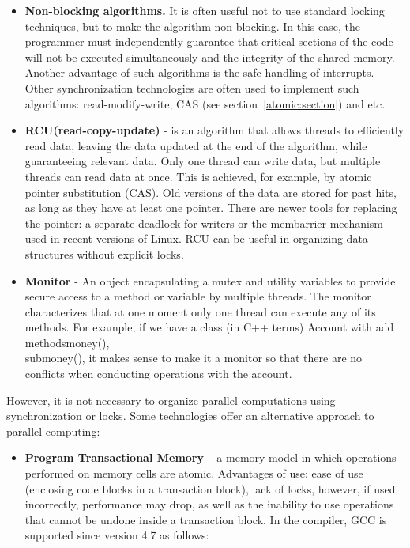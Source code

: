 {\begin{itemize}
			\item\textbf{Non-blocking algorithms.} It is often useful not to use standard locking techniques, but to make the algorithm non-blocking. In this case, the programmer must independently guarantee that critical sections of the code will not be executed simultaneously and the integrity of the shared memory. Another advantage of such algorithms is the safe handling of interrupts. Other synchronization technologies are often used to implement such algorithms: read-modify-write, CAS (see section~\ref{atomic:section}) and etc.
			\item\textbf{RCU(read-copy-update)} - is an algorithm that allows threads to efficiently read data, leaving the data updated at the end of the algorithm, while guaranteeing relevant data. Only one thread can write data, but multiple threads can read data at once. This is achieved, for example, by atomic pointer substitution (CAS). Old versions of the data are stored for past hits, as long as they have at least one pointer. There are newer tools for replacing the pointer: a separate deadlock for writers or the membarrier mechanism used in recent versions of Linux. RCU can be useful in organizing data structures without explicit locks.
			\item\textbf{Monitor} - An object encapsulating a mutex and utility variables to provide secure access to a method or variable by multiple threads. The monitor characterizes that at one moment only one thread can execute any of its methods. For example, if we have a class (in C++ terms) Account with add methods\textunderscore money(),\\sub\textunderscore money(), it makes sense to make it a monitor so that there are no conflicts when conducting operations with the account.
		\end{itemize}
		\par However, it is not necessary to organize parallel computations using synchronization or locks. Some technologies offer an alternative approach to parallel computing:
		\begin{itemize}
			\item\textbf{Program Transactional Memory} – a memory model in which operations performed on memory cells are atomic. Advantages of use: ease of use (enclosing code blocks in a transaction block), lack of locks, however, if used incorrectly, performance may drop, as well as the inability to use operations that cannot be undone inside a transaction block. In the compiler, GCC is supported since version 4.7 as follows:

\end{itemize}}
